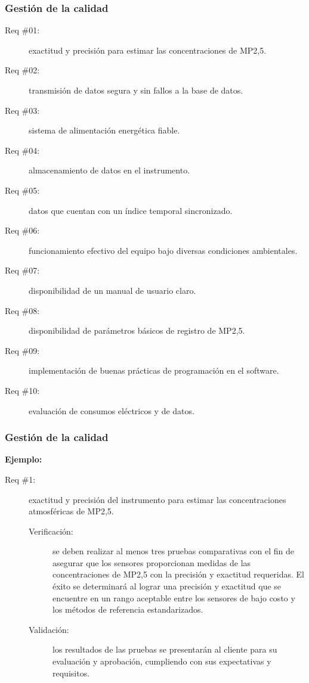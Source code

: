 \documentclass[aspectratio=169]{beamer}
\begin{document}
\begin{frame}
	\frametitle{Gestión de la calidad}
\begin{description}
	
	\item [Req \#01:] exactitud y precisión  para estimar las concentraciones de MP2,5.
	\item [Req \#02:] transmisión de datos segura y sin fallos a la base de datos.
	\item [Req \#03:] sistema de alimentación energética fiable.
	\item [Req \#04:] almacenamiento de datos en el instrumento.
	\item [Req \#05:] datos que cuentan con un índice temporal sincronizado.
	\item [Req \#06:] funcionamiento efectivo del equipo bajo diversas condiciones ambientales. 
	\item [Req \#07:] disponibilidad de un manual de usuario claro.
	\item [Req \#08:] disponibilidad de parámetros básicos de registro  de MP2,5.
	\item [Req \#09:] implementación de buenas prácticas de programación en el software.
	\item [Req \#10:] evaluación de consumos eléctricos y de datos.

\end{description}
\end{frame}
\begin{frame}
	\frametitle{Gestión de la calidad}
	\textbf{Ejemplo:}
	

\begin{description}
	
	\item [Req \#1:] exactitud y precisión del instrumento para estimar las concentraciones atmosféricas de MP2,5.
	
	\begin{description}
		\item [Verificación:] se deben realizar al menos tres pruebas comparativas con el fin de asegurar que los sensores proporcionan medidas de las concentraciones de MP2,5 con la precisión y exactitud requeridas. El éxito se determinará al lograr una precisión y exactitud que se encuentre en un rango aceptable entre los sensores de bajo costo y los métodos de referencia estandarizados. 
		\item [Validación:] los resultados de las pruebas se presentarán al cliente para su evaluación y aprobación,  cumpliendo con sus expectativas y requisitos.
	\end{description}
		 
	\end{description} 

\end{frame}
\end{document}
